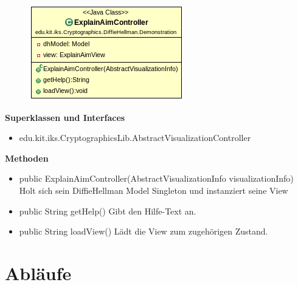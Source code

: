 \documentclass{article}
\begin{document}
      \begin{figure}[H]
        \centering
        \includegraphics[width=\textwidth]{resources/edu-kit-iks-Cryptographics-DiffieHellman-Demonstration-ExplainAimController}
      \end{figure}

      \textbf{Superklassen und Interfaces}
      \begin{itemize}
        \item edu.kit.iks.CryptographicsLib.AbstractVisualizationController
      \end{itemize}

      \textbf{Methoden}
      \begin{itemize}
          \item public ExplainAimController(AbstractVisualizationInfo visualizationInfo) \newline
              Holt sich sein DiffieHellman Model Singleton und instanziert seine View
        \item public String getHelp() \newline
        Gibt den Hilfe-Text an.
        \item public String loadView() \newline
        Lädt die View zum zugehörigen Zustand.
      \end{itemize}

\section{Abläufe}

\glsaddall
\printglossary[numberedsection, style=altlist]
\end{document}
